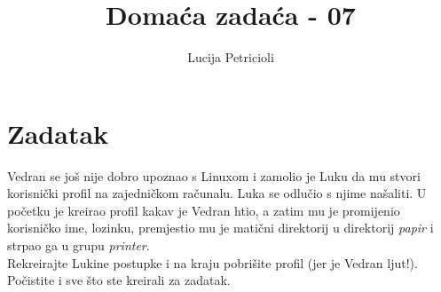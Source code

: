 \documentclass[12pt,a4paper]{article}
\begin{document}
	\title{Domaća zadaća - 07}
	\maketitle
	\author{Lucija Petricioli}
	\section{Zadatak}
	Vedran se još nije dobro upoznao s Linuxom i zamolio je Luku da mu stvori korisnički profil na zajedničkom računalu. Luka se odlučio s njime našaliti. U početku je kreirao profil kakav je Vedran htio, a zatim mu je promijenio korisničko ime, lozinku, premjestio mu je matični direktorij u direktorij \textit{papir} i strpao ga u grupu \textit{printer}. \\
	Rekreirajte Lukine postupke i na kraju pobrišite profil (jer je Vedran ljut!). Počistite i sve što ste kreirali za zadatak.
	
\end{document}
